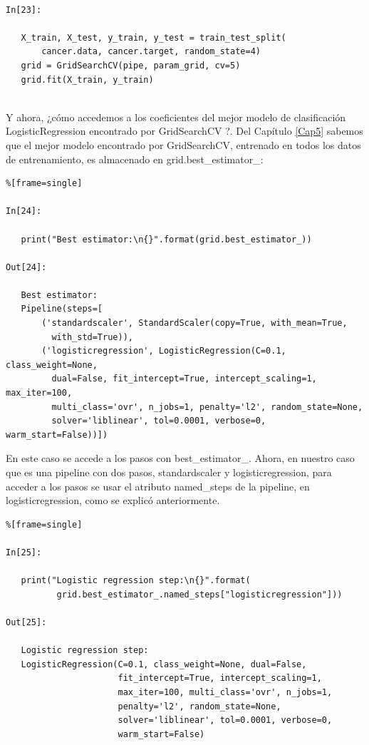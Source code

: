    \begin{lstlisting}
   
In[23]:
   
   X_train, X_test, y_train, y_test = train_test_split(
       cancer.data, cancer.target, random_state=4)
   grid = GridSearchCV(pipe, param_grid, cv=5)
   grid.fit(X_train, y_train)
   
   \end{lstlisting}
   
   Y ahora, ¿cómo accedemos a los coeficientes del mejor modelo de  clasificación {\ttfamily LogisticRegression}    encontrado por {\ttfamily  GridSearchCV} ?.    Del Capítulo \ref{Cap5} sabemos que el     mejor  modelo encontrado por  {\ttfamily  GridSearchCV}, entrenado en todos los datos de entrenamiento, es almacenado en {\ttfamily grid.best\_estimator\_}:
   
   
   \begin{lstlisting}%[frame=single]
   
In[24]:
   
   print("Best estimator:\n{}".format(grid.best_estimator_))
	
Out[24]:
   
   Best estimator:
   Pipeline(steps=[
       ('standardscaler', StandardScaler(copy=True, with_mean=True, 
         with_std=True)),
       ('logisticregression', LogisticRegression(C=0.1, class_weight=None,
         dual=False, fit_intercept=True, intercept_scaling=1, max_iter=100,
         multi_class='ovr', n_jobs=1, penalty='l2', random_state=None,
         solver='liblinear', tol=0.0001, verbose=0, warm_start=False))])   
   \end{lstlisting}
   En este caso se accede a los pasos con  {\ttfamily best\_estimator\_}. Ahora, en nuestro caso que es una pipeline con dos pasos, {\ttfamily
      standardscaler}  y  {\ttfamily logisticregression}, para acceder a los pasos  se  usar el atributo {\ttfamily  named\_steps} de la pipeline,   en   {\ttfamily logisticregression},  como se explicó anteriormente.
   
   \begin{lstlisting}%[frame=single]
   
In[25]:
   
   print("Logistic regression step:\n{}".format(
          grid.best_estimator_.named_steps["logisticregression"]))
   
Out[25]:
	
   Logistic regression step:
   LogisticRegression(C=0.1, class_weight=None, dual=False, 
                      fit_intercept=True, intercept_scaling=1,
                      max_iter=100, multi_class='ovr', n_jobs=1,
                      penalty='l2', random_state=None, 
                      solver='liblinear', tol=0.0001, verbose=0,
                      warm_start=False)
   
   \end{lstlisting}
   
